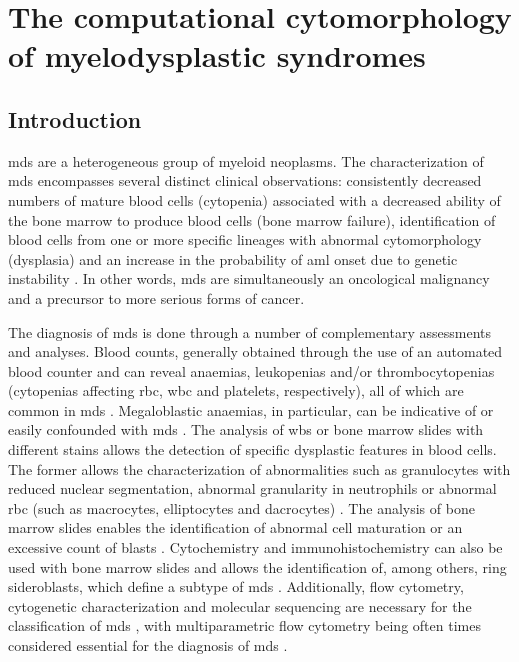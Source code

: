 \chapter{The computational cytomorphology of myelodysplastic syndromes}

\section{Introduction}

\ac{mds} are a heterogeneous group of myeloid neoplasms. The characterization of \ac{mds} encompasses several distinct clinical observations: consistently decreased numbers of mature blood cells (cytopenia) associated with a decreased ability of the bone marrow to produce blood cells (bone marrow failure), identification of blood cells from one or more specific lineages with abnormal cytomorphology (dysplasia) and an increase in the probability of \ac{aml} onset due to genetic instability \cite{Valent2017-uh,Hofmann2005-vv,Aster2020-cu}. In other words, \ac{mds} are simultaneously an oncological malignancy and a precursor to more serious forms of cancer.

The diagnosis of \ac{mds} is done through a number of complementary assessments and analyses. Blood counts, generally obtained through the use of an automated blood counter and can reveal anaemias, leukopenias and/or thrombocytopenias (cytopenias affecting \ac{rbc}, \ac{wbc} and platelets, respectively), all of which are common in \ac{mds} \cite{Najean1989-qm,Campo2017-wi}. Megaloblastic anaemias, in particular, can be indicative of or easily confounded with \ac{mds} \cite{Kaferle2009-pl,Vasekova2016-vo,Corey2007-cs}. The analysis of \ac{wbs} or bone marrow slides with different stains allows the detection of specific dysplastic features in blood cells. The former allows the characterization of abnormalities such as granulocytes with reduced nuclear segmentation, abnormal granularity in neutrophils or abnormal \ac{rbc} (such as macrocytes, elliptocytes and dacrocytes) \cite{Campo2017-wi,Langenhuijsen1984-qx,Kuriyama1986-ts,Davey1988-zn}. The analysis of bone marrow slides enables the identification of abnormal cell maturation or an excessive count of blasts \cite{Aster2020-cu}. Cytochemistry and immunohistochemistry can also be used with bone marrow slides and allows the identification of, among others, ring sideroblasts, which define a subtype of \ac{mds} \cite{Campo2017-wi,Mufti2008-ye}. Additionally, flow cytometry, cytogenetic characterization and molecular sequencing are necessary for the classification of \ac{mds} \cite{Aster2020-cu,Porwit2014-zi,Greenberg2012-en}, with multiparametric flow cytometry being often times considered essential for the diagnosis of \ac{mds} \cite{Cremers2016-fs}.


